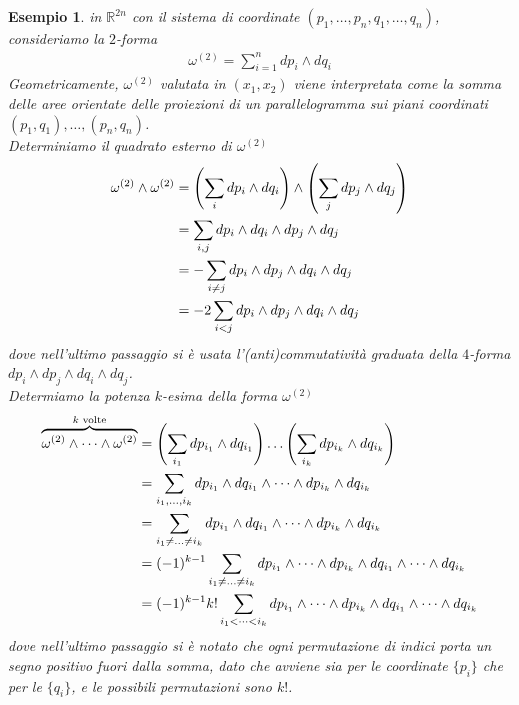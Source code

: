 \documentclass[oneside, 11pt]{amsbook}
\newcommand{\0}{{(0)}}
\newcommand{\3}{{(3)}}
\theoremstyle{colonplain}
\theoremstyle{colondefinition}
\newtheorem{ex}[thm]{Esempio}
\theoremstyle{colonremark}
\numberwithin{equation}{chapter}
\begin{document}
\begin{ex} in $\mathbb{R}^{2n}$ con il sistema di coordinate $(p_1, \dots, p_n, q_1, \dots, q_n)$, consideriamo la $2$-forma 
\begin{align}
    \omega^{(2)} = \sum_{i = 1}^n dp_i \wedge dq_i 
\end{align}
Geometricamente, $\omega^{(2)}$ valutata in $(x_1, x_2)$ viene interpretata come la somma delle aree orientate delle proiezioni di un parallelogramma sui piani coordinati $(p_1, q_1), \dots, (p_n, q_n)$. \\
Determiniamo il quadrato esterno di $\omega^{(2)}$
\begin{align}
    \omega^{(2)} \wedge \omega^{(2)} &= \left(\sum_i dp_i \wedge dq_i\right) \wedge \left(\sum_j dp_j \wedge dq_j\right) \notag \\
    &= \sum_{i, j}dp_i \wedge dq_i \wedge dp_j \wedge dq_j \notag \\
    &= -\sum_{i \neq j} dp_i \wedge dp_j \wedge dq_i \wedge dq_j \notag \\
    &= -2\sum_{i < j} dp_i \wedge dp_j \wedge dq_i \wedge dq_j 
\end{align}
dove nell'ultimo passaggio si è usata l'(anti)commutatività graduata della $4$-forma $dp_i \wedge dp_j \wedge dq_i \wedge dq_j$. \\
Determiamo la potenza $k$-esima della forma $\omega^{(2)}$
\begin{align}
    \overbrace{\omega^{(2)} \wedge \dots \wedge \omega^{(2)}}^{k \text{ volte}} &= \left(\sum_{i_1}dp_{i_1} \wedge dq_{i_1}\right) \dots \left(\sum_{i_k}dp_{i_k} \wedge dq_{i_k}\right) \notag \\
    &= \sum_{i_1, \dots, i_k} dp_{i_1} \wedge dq_{i_1} \wedge \dots \wedge dp_{i_k} \wedge dq_{i_k} \notag \\
    &= \sum_{i_1 \neq \dots \neq i_k} dp_{i_1} \wedge dq_{i_1} \wedge \dots \wedge dp_{i_k} \wedge dq_{i_k} \notag \\
    &= (-1)^{k - 1}\sum_{i_1 \neq \dots \neq i_k} dp_{i_1} \wedge \dots \wedge dp_{i_k} \wedge dq_{i_1} \wedge \dots \wedge dq_{i_k} \notag \\
    &= (-1)^{k - 1}k!\sum_{i_1 < \dots < i_k} dp_{i_1} \wedge \dots \wedge dp_{i_k} \wedge dq_{i_1} \wedge \dots \wedge dq_{i_k}
\end{align}
dove nell'ultimo passaggio si è notato che ogni permutazione di indici porta un segno positivo fuori dalla somma, dato che avviene sia per le coordinate $\{p_i\}$ che per le $\{q_i\}$, e le possibili permutazioni sono $k!$.
\end{ex}
\end{document}
